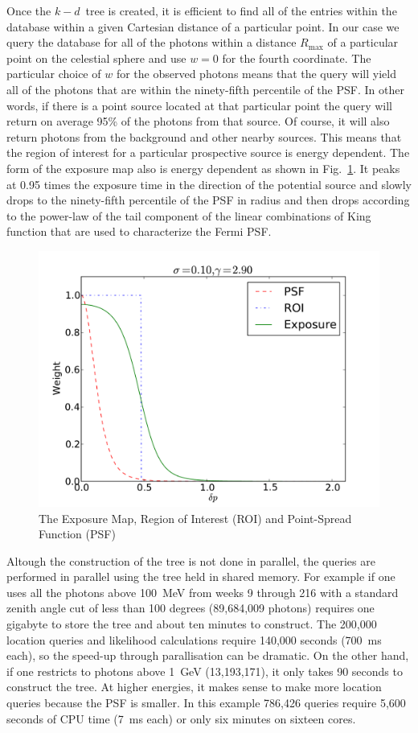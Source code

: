 \documentclass[useAMS,usenatbib]{mn2e}
\begin{document}
Once the $k-d$~tree is created, it is efficient to find all of the
entries within the database within a given Cartesian distance of a
particular point.  In our case we query the database for all of the
photons within a distance $R_\mathrm{max}$ of a particular point on
the celestial sphere and use $w=0$ for the fourth coordinate.  The
particular choice of $w$ for the observed photons means that the query
will yield all of the photons that are within the ninety-fifth
percentile of the PSF.  In other words, if there is a point source
located at that particular point the query will return on average 95\%
of the photons from that source.  Of course, it will also return
photons from the background and other nearby sources.  This means that
the region of interest for a particular prospective source is energy
dependent.  The form of the exposure map also is energy dependent as
shown in Fig.~\ref{fig:expmap}.  It peaks at 0.95 times the exposure
time in the direction of the potential source and slowly drops to the
ninety-fifth percentile of the PSF in radius and then drops according
to the power-law of the tail component of the linear combinations of
King function that are used to characterize the Fermi PSF. 
\begin{figure}
\includegraphics[width=\columnwidth]{expmap}
\caption{The Exposure Map, Region of Interest (ROI)
  and Point-Spread Function (PSF)}
\label{fig:expmap}
\end{figure}

Altough the construction of the tree is not done in parallel, the
queries are performed in parallel using the tree held in shared
memory.  For example if one uses all the photons above 100~MeV from
weeks 9 through 216 with a standard zenith angle cut of less than 100
degrees (89,684,009 photons) requires one gigabyte to store the tree
and about ten minutes to construct. The 200,000 location queries and
likelihood calculations require 140,000 seconds (700~ms each), so the
speed-up through parallisation can be dramatic.  On the other hand, if
one restricts to photons above 1~GeV (13,193,171), it only takes 90
seconds to construct the tree.  At higher energies, it makes sense to
make more location queries because the PSF is smaller.  In this
example 786,426 queries require 5,600 seconds of CPU time (7~ms each)
or only six minutes on sixteen cores.
\end{document}
